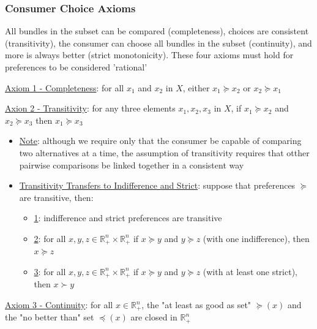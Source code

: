 \documentclass{article}
\begin{document}
\subsubsection{Consumer Choice Axioms}
All bundles in the subset can be compared (completeness), choices are consistent (transitivity), the consumer can choose all bundles in the subset (continuity), and more is always better (strict monotonicity). These four axioms must hold for preferences to be considered 'rational' \par \vspace{0.3em}
  \underline{Axiom 1 - Completeness}: for all $x_{1}$ and $x_{2}$ in $X$, either $x_{1} \succeq x_{2}$ or $x_{2} \succeq x_{1}$ \par
  \underline{Axion 2 - Transitivity}: for any three elements $x_{1}, x_{2}, x_{3}$ in $X$, if $x_{1} \succeq x_{2}$ and $x_{2} \succeq x_{3}$ then $x_{1} \succeq x_{3}$
  \begin{itemize}
    \item  \underline{Note}: although we require only that the consumer be capable of comparing two alternatives at a time, the assumption of transitivity requires that otther pairwise comparisons be linked together in a consistent way
    \item  \underline{Transitivity Transfers to Indifference and Strict}: suppose that preferences $\succeq$ are transitive, then:
    \begin{itemize}
      \item  \underline{1}: indifference and strict preferences are transitive
      \item  \underline{2}: for all $x, y, z \in \mathbb{R}_{+}^{n} \times \mathbb{R}_{+}^{n}$ if $x \succeq y$ and $y \succeq z$ (with one indifference), then $x \succeq z$
      \item  \underline{3}: for all $x, y, z \in \mathbb{R}_{+}^{n} \times \mathbb{R}_{+}^{n}$ if $x \succeq y$ and $y \succeq z$ (with at least one strict), then $x \succ y$
    \end{itemize}
  \end{itemize}
  \par
  \underline{Axiom 3 - Continuity}: for all $x \in \mathbb{R}_{+}^{n}$, the "at least as good as set" $\succeq (x)$ and the "no better than" set $\preceq (x)$ are closed in $\mathbb{R}_{+}^{n}$
\end{document}
